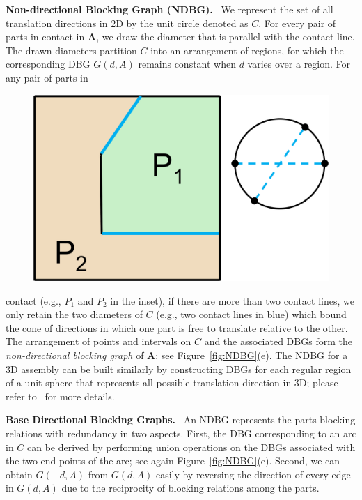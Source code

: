 \vspace*{1.0mm}
\noindent
{\bf Non-directional Blocking Graph (NDBG).} \
We represent the set of all translation directions in 2D by the unit circle denoted as $C$.
For every pair of parts in contact in $\mathbf{A}$, we draw the diameter that is parallel with the contact line.
The drawn diameters partition $C$ into an arrangement of regions, for which the corresponding DBG $G(d, A)$ remains constant when $d$ varies over a region.
For any pair of parts in 
\setlength{\columnsep}{13pt}
\begin{figure}
	\vspace{-6pt}
	\centering
	\hspace{-4pt}
	\includegraphics[width=0.32\columnwidth]{images/NDBG_Diameter.png}
	\vspace{-5pt}
\end{figure}
contact (e.g., $P_1$ and $P_2$ in the inset), if there are more than two contact lines, we only retain the two diameters of $C$ (e.g., two contact lines in blue) which bound the cone of directions in which one part is free to translate relative to the other.
The arrangement of points and intervals on $C$ and the associated DBGs form the {\em non-directional blocking graph} of $\mathbf{A}$; see Figure~\ref{fig:NDBG}(e).
The NDBG for a 3D assembly can be built similarly by constructing DBGs for each regular region of a unit sphere that represents all possible translation direction in 3D; please refer to~\cite{Wilson-1994-GeometricReasoning} for more details.



\vspace*{1.0mm}
\noindent
{\bf Base Directional Blocking Graphs.} \
An NDBG represents the parts blocking relations with redundancy in two aspects.
First, the DBG corresponding to an arc in $C$ can be derived by performing union operations on the DBGs associated with the two end points of the arc; see again Figure~\ref{fig:NDBG}(e).
Second, we can obtain $G(-d, A)$ from $G(d, A)$ easily by reversing the direction of every edge in $G(d, A)$ due to the reciprocity of  blocking relations among the parts.

